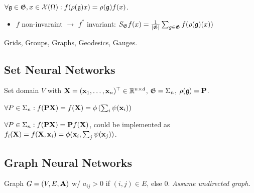 \begin{definition}[\(\G\)-equivariance]
    \(\forall \mathfrak{g} \in \mathfrak{G}, x\in\operatorname{\mathcal{X}}(\Omega): f(\rho(\mathfrak{g})x) = \rho(\mathfrak{g})f(x)\).
\end{definition}

\begin{colored}
    \begin{itemize}
        \item \(f\) non-invaraint \(\to\) \(f^*\) invariant: \(S_{\mathfrak{G}} f(x) = \frac{1}{|\mathfrak{G}|}\sum_{g \in \mathfrak{G}} f(\rho(\mathfrak{g})(x))\)
    \end{itemize}
\end{colored}


\begin{definition}[5-Gs]
    Grids, Groups, Graphs, Geodesics, Gauges.
\end{definition}

\subsection{Set Neural Networks}
Set domain \(V\) with \(\vb{X} = (\vb{x}_1, \ldots, \vb{x}_n)^\top \in \mathbb{R}^{n\times d}\), \(\mathfrak{G} = \Sigma_n\), \(\rho(\mathfrak{g}) = \vb{P}\).

\begin{definition}
    \(\forall P \in \Sigma_n: f(\vb{P}\vb{X}) = f(\vb{X}) = \phi\left(\sum_i \psi(\vb{x}_i)\right)\)
\end{definition}

\begin{definition}
    \(\forall P \in \Sigma_n: f(\vb{P}\vb{X}) = \vb{P} f(\vb{X})\), could be implemented as \(f_i(\vb{X}) = f(\vb{X}, \vb{x}_i) = \phi(\vb{x}_i, \sum_{j} \psi(\vb{x}_j))\).
\end{definition}

\subsection{Graph Neural Networks}
Graph \(G = (V, E, \vb{A})\) w/ \(a_{ij} > 0\) if \((i, j) \in E\), else \(0\).
\textit{Assume undirected graph.}

